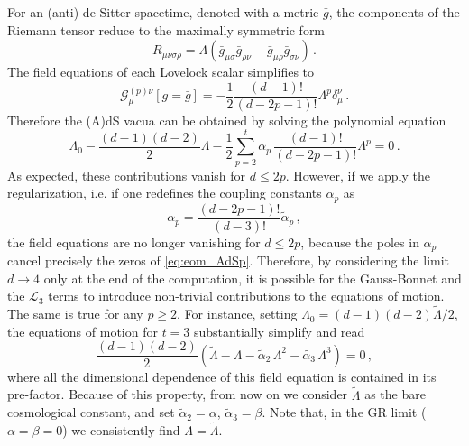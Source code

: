\documentclass[aps,prd,preprint,nofootinbib]{revtex4-1}
\begin{document}
For an (anti)-de Sitter spacetime, denoted with a metric $\bar{g}$, the components of the Riemann tensor reduce to the maximally symmetric form
\begin{equation}
R_{\mu\nu\sigma\rho}  = \Lambda \left(  \bar{g}_{\mu\sigma}  \bar{g}_{\rho \nu}  -   \bar{g}_{\mu \rho}  \bar{g}_{\sigma \nu} \right) \,.
\end{equation}{}
The field equations of each Lovelock scalar simplifies to 
\begin{equation}
\mathcal{G}_{\mu}^{(p)\nu} \left[ g=  \bar{g}  \right] = -\frac{1}{2} \frac{(d-1)!}{(d-2p-1)!} \Lambda^{p} \delta_\mu^\nu \,.
\label{eq:eom_AdSp}
\end{equation}{}
Therefore the (A)dS vacua can be obtained by solving the polynomial equation
\begin{equation}
 \Lambda_0 -\frac{(d-1)(d-2)}{2}  
 \Lambda -\frac{1}{2}  \sum_{p=2}^t \alpha_p \, \frac{(d-1)!}{(d-2p-1)!} \Lambda^{p}  =0  \, .
\end{equation}{}
As expected, these contributions vanish for $d \leq 2p$. However, if we apply the regularization, i.e. if one redefines the coupling constants $\alpha_p$ as  
\begin{equation}
\alpha_p = \frac{(d-2p-1)!}{(d-3)!} \tilde{\alpha}_p  \,,
\end{equation}
the field equations are no longer vanishing for $d \leq 2p$, because the poles in $\alpha_p$ cancel precisely the zeros of \eqref{eq:eom_AdSp}. Therefore, by considering the limit $d\rightarrow 4$ only at the end of the computation, it is possible for the Gauss-Bonnet and the $\mathcal{L}_3$ terms to introduce non-trivial contributions to the equations of motion. The same is true for any $p\geq 2$. For instance, setting $\Lambda_0=(d-1)(d-2) \tilde{\Lambda}/2$, the equations of motion for $t=3$ substantially simplify and read
\begin{equation}
\frac{(d-1)(d-2)}{2}\left( \tilde{\Lambda} - 
 \Lambda -  \tilde{\alpha}_2 \, \Lambda^2  -  \tilde{\alpha_3} \, \Lambda^3 \right)=0  \,, \label{eq:eom_t3_redef}
\end{equation}
where all the dimensional dependence of this field equation is contained in its pre-factor. Because of this property, from now on we consider $\tilde{\Lambda}$ as the bare cosmological constant, and set $\tilde{\alpha}_2 = \alpha$, $\tilde{\alpha}_3 = \beta$. Note that, in the GR limit ($\alpha=\beta=0$) we consistently find $\Lambda =\tilde{\Lambda}$.
\end{document}
